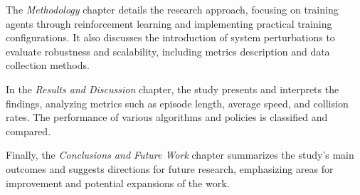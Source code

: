 The \textit{Methodology} chapter details the research approach, focusing on training agents through reinforcement learning and implementing practical 
training configurations. 
It also discusses the introduction of system perturbations to evaluate robustness and scalability, including metrics description and data collection 
methods.

In the \textit{Results and Discussion} chapter, the study presents and interprets the findings, analyzing metrics such as episode length, average speed, 
and collision rates. The performance of various algorithms and policies is classified and compared.

Finally, the \textit{Conclusions and Future Work} chapter summarizes the study's main outcomes and suggests directions for future research, 
emphasizing areas for improvement and potential expansions of the work.
